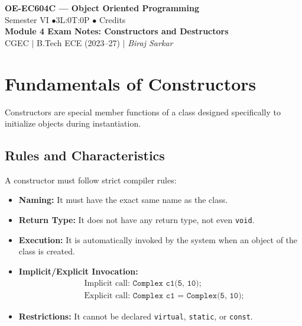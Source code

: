 \documentclass[12pt,a4paper]{article}
\begin{document}

\begin{center}
  {\LARGE\bfseries\color{myred} OE-EC604C --- Object Oriented Programming}\\[5pt]
  {\normalsize\color{mydark} Semester VI \quad$\bullet$\quad 3L:0T:0P \quad$\bullet$ Credits}\\[3pt]
  {\normalsize\color{myteal}\textbf{Module 4 Exam Notes: Constructors and Destructors}}\\[3pt]
  {\small\color{mydark} CGEC \;$|$\; B.Tech ECE (2023--27) \;$|$\; \textit{Biraj Sarkar}}
\end{center}
\vspace{2pt}
\noindent{\color{myred}\rule{\linewidth}{1.5pt}}
\vspace{2pt}

\hypersetup{linkcolor=mydark}
\tableofcontents
\hypersetup{linkcolor=myteal}
\newpage

\section{Fundamentals of Constructors}

Constructors are special member functions of a class designed specifically to initialize objects during instantiation.

\subsection{Rules and Characteristics}
A constructor must follow strict compiler rules:
\begin{itemize}[leftmargin=*, itemsep=3pt]
  \item \textbf{Naming:} It must have the exact same name as the class.
  \item \textbf{Return Type:} It does not have any return type, not even \texttt{void}.
  \item \textbf{Execution:} It is automatically invoked by the system when an object of the class is created.
  \item \textbf{Implicit/Explicit Invocation:} 
    \begin{align}
      &\text{Implicit call: } \texttt{Complex c1(5, 10);} \\
      &\text{Explicit call: } \texttt{Complex c1 = Complex(5, 10);}
    \end{align}
  \item \textbf{Restrictions:} It cannot be declared \texttt{virtual}, \texttt{static}, or \texttt{const}.
\end{itemize}
\end{document}
